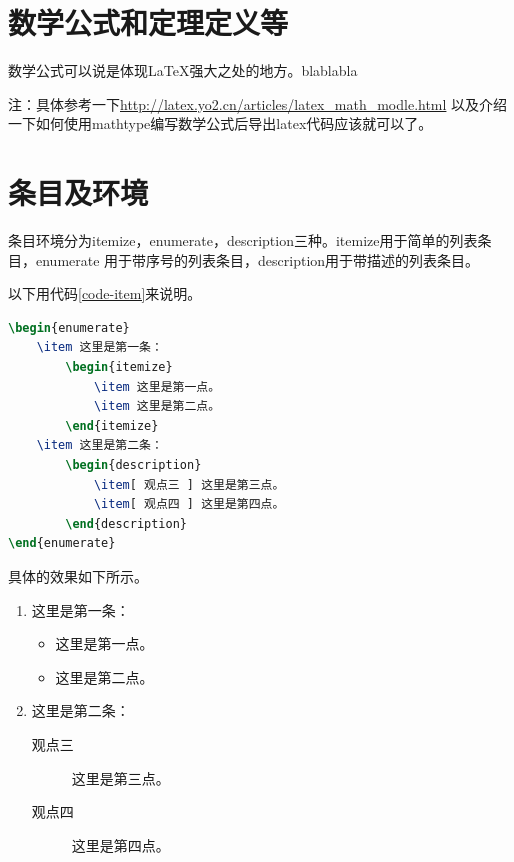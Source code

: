 \section{数学公式和定理定义等}
数学公式可以说是体现\LaTeX{}强大之处的地方。blablabla

注：具体参考一下\url{http://latex.yo2.cn/articles/latex_math_modle.html}
以及介绍一下如何使用mathtype编写数学公式后导出latex代码应该就可以了。

\section{条目及环境}
条目环境分为itemize，enumerate，description三种。itemize用于简单的列表条目，enumerate
用于带序号的列表条目，description用于带描述的列表条目。

以下用代码\ref{code-item}来说明。
\begin{lstlisting}[label={code-item},caption={条目环境},language={LaTeX}]
\begin{enumerate}
    \item 这里是第一条：
        \begin{itemize}
            \item 这里是第一点。
            \item 这里是第二点。
        \end{itemize}
    \item 这里是第二条：
        \begin{description}
            \item[ 观点三 ] 这里是第三点。
            \item[ 观点四 ] 这里是第四点。
        \end{description}
\end{enumerate}
\end{lstlisting}

具体的效果如下所示。
\begin{enumerate}
    \item 这里是第一条：
        \begin{itemize}
            \item 这里是第一点。
            \item 这里是第二点。
        \end{itemize}
    \item 这里是第二条：
        \begin{description}
            \item[观点三] 这里是第三点。
            \item[观点四] 这里是第四点。
        \end{description}
\end{enumerate}

